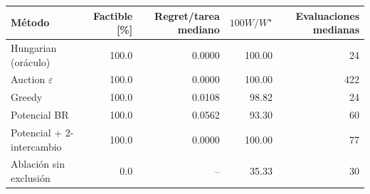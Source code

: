 \begin{tabular}{lrrrr}
\toprule
Método & Factible [\%] & Regret/tarea mediano & $100W/W^\star$ & Evaluaciones medianas \\
\midrule
Hungarian (oráculo) & 100.0 & 0.0000 & 100.00 & 24 \\
Auction $\varepsilon$ & 100.0 & 0.0000 & 100.00 & 422 \\
Greedy & 100.0 & 0.0108 & 98.82 & 24 \\
Potencial BR & 100.0 & 0.0562 & 93.30 & 60 \\
Potencial + 2-intercambio & 100.0 & 0.0000 & 100.00 & 77 \\
Ablación sin exclusión & 0.0 & -- & 35.33 & 30 \\
\bottomrule
\end{tabular}
